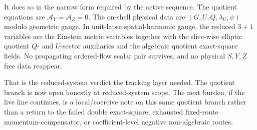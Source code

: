 \documentclass[11pt]{article}
\newcommand{\AY}{\mathcal A_Y}
\newcommand{\AZ}{\mathcal A_Z}
\begin{document}
It does so in the narrow form required by the active sequence. The quotient equations are \(\AY=\AZ=0\). The on-shell physical data are \((G,U,Q,\lambda_U,\psi)\) modulo geometric gauge. In unit-lapse spatial-harmonic gauge, the reduced \(3+1\) variables are the Einstein metric variables together with the slice-wise elliptic quotient \(Q\)- and \(U\)-sector auxiliaries and the algebraic quotient exact-square fields. No propagating ordered-flow scalar pair survives, and no physical \(S,Y,Z\) free data reappear.

That is the reduced-system verdict the tracking layer needed. The quotient branch is now open honestly at reduced-system scope. The next burden, if the live line continues, is a local/coercive note on this same quotient branch rather than a return to the failed double exact-square, exhausted fixed-route momentum-compensator, or coefficient-level negative non-algebraic routes.
\end{document}
